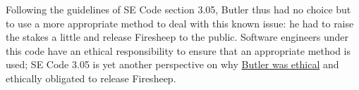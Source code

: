 \documentclass[11pt]{article}
\begin{document}
\begin{multicols}{2}
Following the guidelines of SE Code section 3.05, Butler thus had no choice but to use a more appropriate method to deal with this known issue: he had to raise the stakes a little and release Firesheep to the public. Software engineers under this code have an ethical responsibility to ensure that an appropriate method is used; SE Code 3.05 is yet another perspective on why \uline{Butler was ethical} and ethically obligated to release Firesheep.









\end{multicols}
\end{document}
